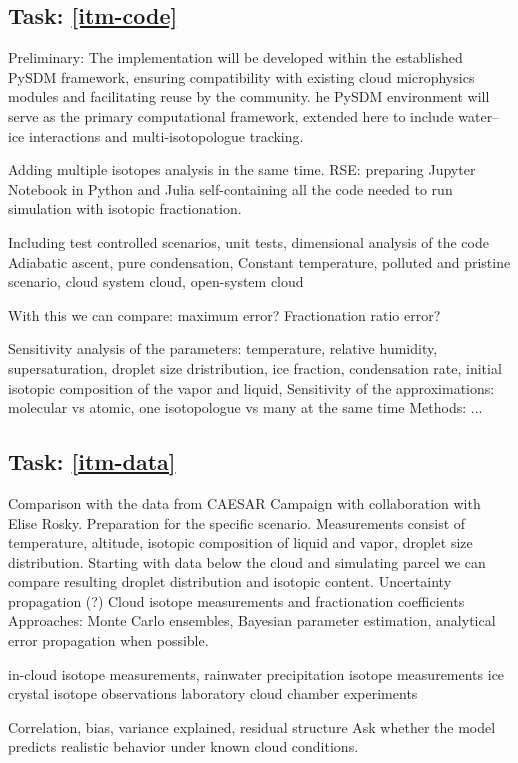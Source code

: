 \documentclass[11pt,a4paper]{article}
\begin{document}
\subsection{Task: \ref{itm-code}}
Preliminary: The implementation will be developed within the established PySDM framework, ensuring
compatibility with existing cloud microphysics modules and facilitating reuse by the community.
he PySDM environment will serve as the primary computational framework, extended here to include water–ice interactions and multi-isotopologue tracking.

Adding multiple isotopes analysis in the same time.
RSE: preparing Jupyter Notebook in Python and Julia self-containing all the code needed
to run simulation with isotopic fractionation.

Including test controlled scenarios, unit tests, dimensional analysis of the code
Adiabatic ascent, pure condensation, Constant temperature, polluted and pristine scenario, cloud system cloud, open-system cloud

With this we can compare: maximum error?
Fractionation ratio error? 

Sensitivity analysis of the parameters: temperature, relative humidity, supersaturation, droplet size dristribution, ice fraction, condensation rate, 
initial isotopic composition of the vapor and liquid, 
Sensitivity of the approximations: molecular vs atomic, one isotopologue vs many at the same time
Methods: ...



\subsection{Task: \ref{itm-data}}
Comparison with the data from CAESAR Campaign with collaboration with Elise Rosky.
Preparation for the specific scenario.
Measurements consist of temperature, altitude, isotopic composition of liquid and vapor, droplet size distribution.
Starting with data below the cloud and simulating parcel we can compare resulting droplet distribution and isotopic content.
Uncertainty propagation (?)
Cloud isotope measurements and fractionation coefficients
Approaches: Monte Carlo ensembles, Bayesian parameter estimation, analytical error propagation when possible.

in-cloud isotope measurements, rainwater precipitation isotope measurements
ice crystal isotope observations
laboratory cloud chamber experiments

Correlation, bias, variance explained, residual structure
Ask whether the model predicts realistic behavior under known cloud conditions.
\end{document}
